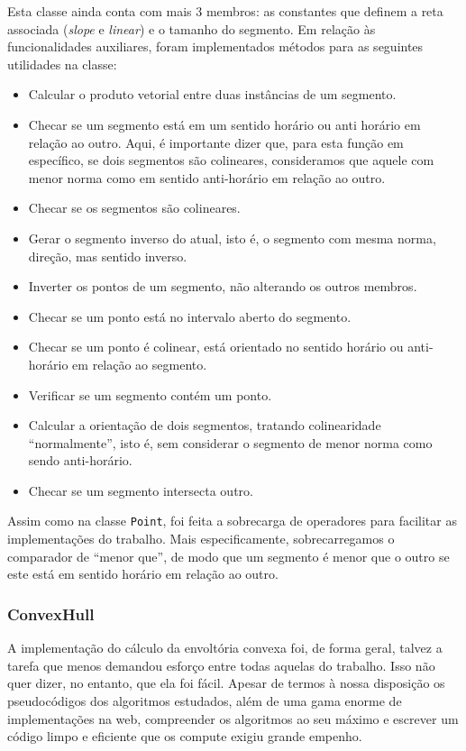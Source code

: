 \documentclass{article}
\begin{document}
Esta classe ainda conta com mais 3 membros: as constantes que definem a reta associada (\textit{slope} e \textit{linear}) e o tamanho do segmento. Em relação às funcionalidades auxiliares, foram implementados métodos para as seguintes utilidades na classe:

\begin{itemize}
	\item Calcular o produto vetorial entre duas instâncias de um segmento.
	\item Checar se um segmento está em um sentido horário ou anti horário em relação ao outro. Aqui, é importante dizer que, para esta função em específico, se dois segmentos são colineares, consideramos que aquele com menor norma como em sentido anti-horário em relação ao outro.
	\item Checar se os segmentos são colineares.
	\item Gerar o segmento inverso do atual, isto é, o segmento com mesma norma, direção, mas sentido inverso.
	\item Inverter os pontos de um segmento, não alterando os outros membros.
	\item Checar se um ponto está no intervalo aberto do segmento.
	\item Checar se um ponto é colinear, está orientado no sentido horário ou anti-horário em relação ao segmento.
	\item Verificar se um segmento contém um ponto.
	\item Calcular a orientação de dois segmentos, tratando colinearidade ``normalmente'', isto é, sem considerar o segmento de menor norma como sendo anti-horário.
	\item Checar se um segmento intersecta outro.
\end{itemize}

Assim como na classe \texttt{Point}, foi feita a sobrecarga de operadores para facilitar as implementações do trabalho. Mais especificamente, sobrecarregamos o comparador de ``menor que'', de modo que um segmento é menor que o outro se este está em sentido horário em relação ao outro.

\subsubsection{ConvexHull}

A implementação do cálculo da envoltória convexa foi, de forma geral, talvez a tarefa que menos demandou esforço entre todas aquelas do trabalho. Isso não quer dizer, no entanto, que ela foi fácil. Apesar de termos à nossa disposição os pseudocódigos dos algoritmos estudados, além de uma gama enorme de implementações na web, compreender os algoritmos ao seu máximo e escrever um código limpo e eficiente que os compute exigiu grande empenho.
\end{document}
